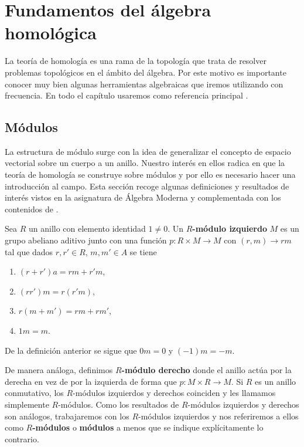 
\chapter{Fundamentos del álgebra homológica}
La teoría de homología es una rama de la topología que trata de resolver
problemas topológicos en el ámbito del álgebra. Por este motivo es importante conocer
muy bien algunas herramientas algebraicas que iremos utilizando con frecuencia.
En todo el capítulo usaremos como referencia principal
\cite{maclane2012homology}.

\section{Módulos}

La estructura de módulo surge con la idea de generalizar el concepto de espacio vectorial
sobre un cuerpo a un anillo. Nuestro interés en ellos radica en que la teoría de
homología se construye sobre módulos y por ello es necesario hacer una
introducción al campo. Esta sección recoge algunas definiciones y resultados de interés
vistos en la asignatura de Álgebra Moderna y complementada con los contenidos de
\cite{dummit2004abstract}.

\begin{definicion}
	Sea \(R\) un anillo con elemento identidad \(1 \neq 0\). Un \textbf{\(R\)-módulo
		izquierdo} \(M\) es un grupo abeliano aditivo junto con una función \(p: R \times
	M \rightarrow M\) con \((r, m) \to rm\) tal que dados \(r,r' \in R\), \(m,m' \in A\)
	se tiene
	\begin{enumerate}
		\item \((r+r') a = r m + r' m\),
		
		\item \((rr') m = r (r' m)\),
		
		\item \(r(m+m') = rm + rm'\),
		
		\item \(1m = m\).
	\end{enumerate}
\end{definicion}

De la definición anterior se sigue que \(0m = 0\) y \((-1)m = -m\).

De manera análoga, definimos \textbf{\(R\)-módulo derecho} donde el anillo actúa
por la derecha en vez de por la izquierda de forma que
\(p: M \times R \rightarrow M\). Si \(R\) es un anillo conmutativo, los \(R\)-módulos
izquierdos y derechos coinciden y les llamamos simplemente \(R\)-módulos. Como los
resultados de \(R\)-módulos izquierdos y derechos son análogos, trabajaremos con
los \(R\)-módulos izquierdos y nos referiremos a ellos como \textbf{\(R\)-módulos} o
\textbf{módulos} a menos que se indique explícitamente lo contrario.

